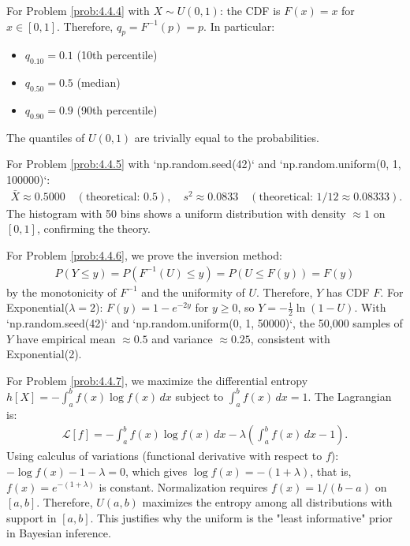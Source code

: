 \begin{solucion}
	\label{sol:4.4.4}
	For Problem \ref{prob:4.4.4} with $X \sim U(0, 1)$: the CDF is $F(x) = x$ for $x \in [0, 1]$. Therefore, $q_{p} = F^{-1}(p) = p$. In particular:
	\begin{itemize}
		\item $q_{0.10} = 0.1$ (10th percentile)
		\item $q_{0.50} = 0.5$ (median)
		\item $q_{0.90} = 0.9$ (90th percentile)
	\end{itemize}
	The quantiles of $U(0, 1)$ are trivially equal to the probabilities.
\end{solucion}

\begin{solucion}
	\label{sol:4.4.5}
	For Problem \ref{prob:4.4.5} with `np.random.seed(42)` and `np.random.uniform(0, 1, 100000)`:
	\begin{align*}
		\bar{X} \approx 0.5000 \quad (\text{theoretical: } 0.5), \quad s^{2} \approx 0.0833 \quad (\text{theoretical: } 1/12 \approx 0.08333).
	\end{align*}
	The histogram with 50 bins shows a uniform distribution with density $\approx 1$ on $[0, 1]$, confirming the theory.
\end{solucion}

\begin{solucion}
	\label{sol:4.4.6}
	For Problem \ref{prob:4.4.6}, we prove the inversion method:
	\begin{align*}
		P(Y \le y) = P(F^{-1}(U) \le y) = P(U \le F(y)) = F(y)
	\end{align*}
	by the monotonicity of $F^{-1}$ and the uniformity of $U$. Therefore, $Y$ has CDF $F$. For Exponential($\lambda = 2$): $F(y) = 1 - e^{-2y}$ for $y \ge 0$, so $Y = -\frac{1}{2}\ln(1-U)$. With `np.random.seed(42)` and `np.random.uniform(0, 1, 50000)`, the 50{,}000 samples of $Y$ have empirical mean $\approx 0.5$ and variance $\approx 0.25$, consistent with Exponential(2).
\end{solucion}

\begin{solucion}
	\label{sol:4.4.7}
	For Problem \ref{prob:4.4.7}, we maximize the differential entropy $h[X] = -\int_{a}^{b} f(x) \log f(x)\,dx$ subject to $\int_{a}^{b} f(x)\,dx = 1$. The Lagrangian is:
	\begin{align*}
		\mathcal{L}[f] = -\int_{a}^{b} f(x) \log f(x)\,dx - \lambda \left( \int_{a}^{b} f(x)\,dx - 1 \right).
	\end{align*}
	Using calculus of variations (functional derivative with respect to $f$): $-\log f(x) - 1 - \lambda = 0$, which gives $\log f(x) = -(1 + \lambda)$, that is, $f(x) = e^{-(1+\lambda)}$ is constant. Normalization requires $f(x) = 1/(b-a)$ on $[a, b]$. Therefore, $U(a, b)$ maximizes the entropy among all distributions with support in $[a, b]$. This justifies why the uniform is the "least informative" prior in Bayesian inference. \quad \qedhere
\end{solucion}

